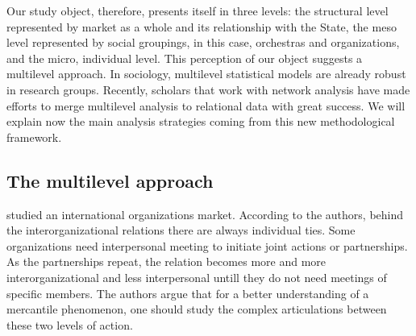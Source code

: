 \documentclass[a4paper, 12pt, openright, oneside, german, french, brazil, english, article]{abntex2}
\begin{document}
	Our study object, therefore, presents itself in three levels: the structural level represented by market as a whole and its relationship with the State, the meso level represented by social groupings, in this case, orchestras and organizations, and the micro, individual level. This perception of our object suggests a multilevel approach. In sociology, multilevel statistical models are already robust in research groups. Recently, scholars that work with network analysis have made efforts to merge multilevel analysis to relational data with great success. We will explain now the main analysis strategies coming from this new methodological framework.
	
	
	\subsection{The multilevel approach}
	
	
	 studied an international organizations market. According to the authors, behind the interorganizational relations there are always individual ties. Some organizations need interpersonal meeting to initiate joint actions or partnerships. As the partnerships repeat, the relation becomes more and more interorganizational and less interpersonal untill they do not need meetings of specific members. The authors argue that for a better understanding of a mercantile phenomenon, one should study the complex articulations between these two levels of action.
	
\end{document}
